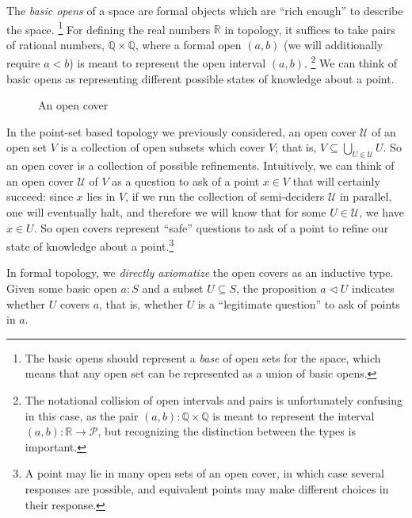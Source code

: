 \documentclass{article}
\newcommand{\cov}{\vartriangleleft}
\newcommand{\rat}{\mathbb{Q}}
\newcommand{\R}{\mathbb{R}}
\newcommand{\Prop}{\mathcal{P}}
\begin{document}
The \emph{basic opens} of a space are formal objects which are ``rich enough'' to describe the space. 
\footnote{The basic opens should represent a \emph{base} of open sets for the space, which means that any open set can be represented as a union of basic opens.}
For defining the real numbers $\R$ in topology, it suffices to take pairs of rational numbers, $\rat \times \rat$, where a formal open $(a, b)$ (we will additionally require $a < b$) is meant to represent the open interval $(a, b)$.
\footnote{The notational collision of open intervals and pairs is unfortunately confusing in this case, as the pair $(a, b) : \rat \times \rat$ is meant to represent the interval $(a, b) : \R \to \Prop$, but recognizing the distinction between the types is important.}
We can think of basic opens as representing different possible states of knowledge about a point.

\begin{figure}[h]
\begin{center}
\end{center}
\caption{An open cover}
\end{figure}

In the point-set based topology we previously considered, an open cover $\mathcal{U}$ of an open set $V$ is a collection of open subsets which cover $V$; that is, $V \subseteq \bigcup_{U \in \mathcal{U}} U$. So an open cover is a collection of possible refinements. Intuitively, we can think of an open cover $\mathcal{U}$ of $V$ as a question to ask of a point $x \in V$ that will certainly succeed: since $x$ lies in $V$, if we run the collection of semi-deciders $\mathcal{U}$ in parallel, one will eventually halt, and therefore we will know that for some $U \in \mathcal{U}$, we have $x \in U$. So open covers represent ``safe'' questions to ask of a point to refine our state of knowledge about a point.\footnote{A point may lie in many open sets of an open cover, in which case several responses are possible, and equivalent points may make different choices in their response.}

In formal topology, we \emph{directly axiomatize} the open covers as an inductive type. Given some basic open $a : S$ and a subset $U \subseteq S$, the proposition $a \cov U$ indicates whether $U$ covers $a$, that is, whether $U$ is a ``legitimate question'' to ask of points in $a$.
\end{document}
